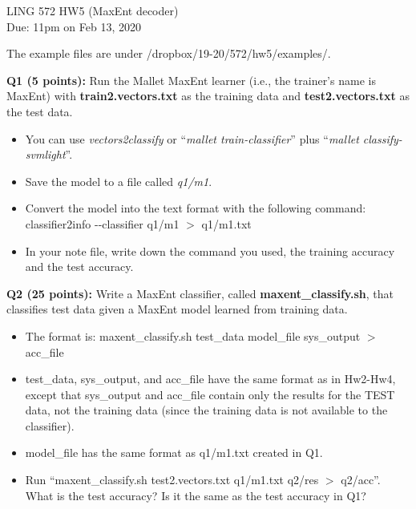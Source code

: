 \documentclass[11pt]{article}
\begin{document}
\begin{center}
\LARGE
LING 572 HW5 (MaxEnt decoder)\\
Due: 11pm on Feb 13, 2020\\
\vspace{0.3in}
\end{center}


The example files are under /dropbox/19-20/572/hw5/examples/.

\vspace{0.3 in}
\noindent
{\bf Q1 (5 points):} Run the Mallet MaxEnt learner (i.e., the trainer's name
is MaxEnt) with {\bf train2.vectors.txt} as the training data 
and {\bf test2.vectors.txt} as the test data. 
\begin{itemize}
  \item You can use {\it vectors2classify} or 
        ``{\it mallet train-classifier}'' plus 
        ``{\it mallet classify-svmlight}''.

  \item Save the model to a file called {\it q1/m1}.

  \item Convert the model into the text format with the following command:
         classifier2info {-}{-}classifier q1/m1 $>$ q1/m1.txt

  \item In your note file, write down the command you used, 
        the training accuracy and the test accuracy.
\end{itemize}



\vspace{0.3 in}
\noindent
{\bf Q2 (25 points):} Write a MaxEnt classifier, 
  called {\bf maxent\_classify.sh},
  that classifies test data given a MaxEnt model learned from 
  training data.
\begin{itemize}
  \item The format is: 
          maxent\_classify.sh test\_data model\_file sys\_output $>$ acc\_file 

  \item test\_data, sys\_output, and acc\_file have the same format as in 
    Hw2-Hw4, except that sys\_output and acc\_file contain only the
    results for the TEST data, not the training data (since the training
    data is not available to the classifier).

  \item model\_file has the same format as q1/m1.txt created in Q1.

  \item Run ``maxent\_classify.sh test2.vectors.txt q1/m1.txt
          q2/res $>$ q2/acc''.
          What is the test accuracy? Is it the same as the test accuracy in 
          Q1? 
\end{itemize}
\end{document}
